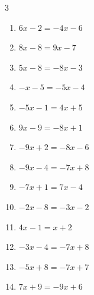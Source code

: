 \begin{multicols}{3}
\begin{enumerate}
  \item $6x-2=-4x-6$


  \item $8x-8=9x-7$

        \phantom{$\displaystyle x=-1$}

  \item $5x-8=-8x-3$


  \item $-x-5=-5x-4$


  \item $-5x-1=4x+5$


  \item $9x-9=-8x+1$


  \item $-9x+2=-8x-6$

        \phantom{$\displaystyle x=8$}

  \item $-9x-4=-7x+8$

        \phantom{$\displaystyle x=-6$}

  \item $-7x+1=7x-4$


\columnbreak %

\resetques

  \item $-2x-8=-3x-2$

        \phantom{$\displaystyle x=6$}

  \item $4x-1=x+2$

        \phantom{$\displaystyle x=1$}

  \item $-3x-4=-7x+8$

        \phantom{$\displaystyle x=3$}

  \item $-5x+8=-7x+7$


  \item $7x+9=-9x+6$


\end{enumerate}
\end{multicols}
